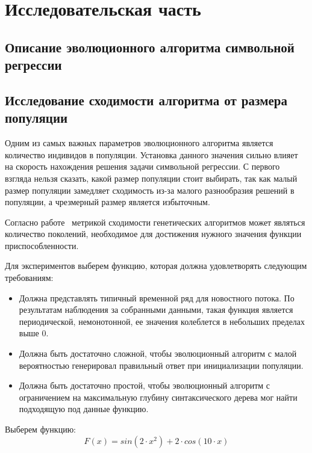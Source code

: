 \section{Исследовательская часть}

\subsection{Описание эволюционного алгоритма символьной регрессии}

\subsection{Исследование сходимости алгоритма от размера популяции}

Одним из самых важных параметров эволюционного алгоритма является количество индивидов в популяции. Установка данного значения сильно влияет на скорость нахождения решения задачи символьной регрессии. С первого взгляда нельзя сказать, какой размер популяции стоит выбирать, так как малый размер популяции замедляет сходимость из-за малого разнообразия решений в популяции, а чрезмерный размер является избыточным. 

Согласно работе~\cite{PopulationSize} метрикой сходимости генетических алгоритмов может являться количество поколений, необходимое для достижения нужного значения функции приспособленности.

Для экспериментов выберем функцию, которая должна удовлетворять следующим требованиям:
\begin{itemize}
\item Должна представлять типичный временной ряд для новостного потока. По результатам наблюдения за собранными данными, такая функция является периодической, немонотонной, ее значения колеблется в небольших пределах выше 0.
\item Должна быть достаточно сложной, чтобы эволюционный алгоритм с малой вероятностью генерировал правильный ответ при инициализации популяции.
\item Должна быть достаточно простой, чтобы эволюционный алгоритм с ограничением на максимальную глубину синтаксического дерева мог найти подходящую под данные функцию.
\end{itemize}

Выберем функцию:
\begin{equation}
\label{equation:testFunction}
F(x) = sin (2 \cdot x ^ 2) + 2 \cdot cos (10 \cdot x)
\end{equation}

